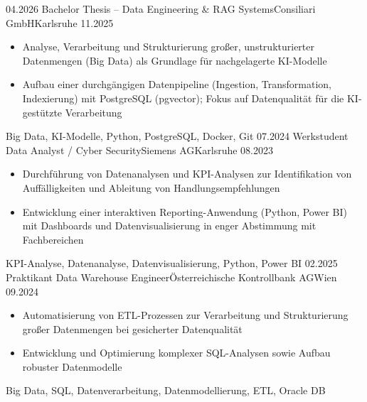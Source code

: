 
\begin{experiences}
  \experience
    {04.2026}   {Bachelor Thesis -- Data Engineering \& RAG Systems}{Consiliari GmbH}{Karlsruhe}
    {11.2025}   {
                  \begin{itemize}
                    \item Analyse, Verarbeitung und Strukturierung großer, unstrukturierter Datenmengen (Big Data) als Grundlage für nachgelagerte KI-Modelle
                    \item Aufbau einer durchgängigen Datenpipeline (Ingestion, Transformation, Indexierung) mit PostgreSQL (pgvector); Fokus auf Datenqualität für die KI-gestützte Verarbeitung
                  \end{itemize}
                }
                {Big Data, KI-Modelle, Python, PostgreSQL, Docker, Git}
  \emptySeparator
  \experience
    {07.2024}   {Werkstudent Data Analyst / Cyber Security}{Siemens AG}{Karlsruhe}
    {08.2023}   {
                  \begin{itemize}
                    \item Durchführung von Datenanalysen und KPI-Analysen zur Identifikation von Auffälligkeiten und Ableitung von Handlungsempfehlungen
                    \item Entwicklung einer interaktiven Reporting-Anwendung (Python, Power BI) mit Dashboards und Datenvisualisierung in enger Abstimmung mit Fachbereichen
                  \end{itemize}
                }
                {KPI-Analyse, Datenanalyse, Datenvisualisierung, Python, Power BI}
  \emptySeparator
  \experience
    {02.2025}   {Praktikant Data Warehouse Engineer}{Österreichische Kontrollbank AG}{Wien}
    {09.2024}   {
                  \begin{itemize}
                    \item Automatisierung von ETL-Prozessen zur Verarbeitung und Strukturierung großer Datenmengen bei gesicherter Datenqualität
                    \item Entwicklung und Optimierung komplexer SQL-Analysen sowie Aufbau robuster Datenmodelle
                  \end{itemize}
                }
                {Big Data, SQL, Datenverarbeitung, Datenmodellierung, ETL, Oracle DB}
\end{experiences}